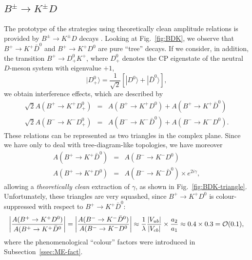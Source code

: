 \documentclass[12pt]{article}
\begin{document}
\subsection{$B^\pm\to K^\pm D$}
\unboldmath
%
%
%
The prototype of the strategies using theoretically clean amplitude 
relations is provided by $B^\pm \to K^\pm D$ decays \cite{gw}. Looking at 
Fig.~\ref{fig:BDK}, we observe that $B^+\to K^+\bar D^0$ and $B^+\to K^+D^0$ 
are pure ``tree'' decays. If we consider, in addition, the transition 
$B^+\to D^0_+K^+$, where $D^0_+$ denotes the CP 
eigenstate of the neutral $D$-meson system with eigenvalue $+1$,
\begin{equation}\label{ED85}
|D^0_+\rangle=\frac{1}{\sqrt{2}}\left[|D^0\rangle+
|\bar D^0\rangle\right],
\end{equation}
we obtain interference effects, which are described by
\begin{eqnarray}
\sqrt{2}A(B^+\to K^+D^0_+)&=&A(B^+\to K^+D^0)+
A(B^+\to K^+\bar D^0)\\
\sqrt{2}A(B^-\to K^-D^0_+)&=&A(B^-\to K^-\bar D^0)+
A(B^-\to K^-D^0).
\end{eqnarray}
These relations can be represented as two triangles in 
the complex plane. Since we have only to deal with tree-diagram-like 
topologies, we have moreover
\begin{eqnarray}
A(B^+\to K^+\bar D^0)&=&A(B^-\to K^-D^0)\\
A(B^+\to K^+D^0)&=&A(B^-\to K^-\bar D^0)\times e^{2i\gamma},
\end{eqnarray}
allowing a {\it theoretically clean} extraction of $\gamma$, as shown 
in Fig.~\ref{fig:BDK-triangle}. Unfortunately, these triangles are 
very squashed, since $B^+\to K^+D^0$ is colour-suppressed 
with respect to $B^+\to K^+\bar D^0$:
\begin{equation}\label{BDK-suppr}
\left|\frac{A(B^+\to K^+D^0)}{A(B^+\to K^+\bar D^0}\right|=
\left|\frac{A(B^-\to K^-\bar D^0)}{A(B^-\to K^-D^0}\right|\approx
\frac{1}{\lambda}\frac{|V_{ub}|}{|V_{cb}|}\times\frac{a_2}{a_1}
\approx 0.4\times0.3={\cal O}(0.1),
\end{equation}
where the phenomenological ``colour'' factors were introduced in
Subsection~\ref{ssec:ME-fact}. 
\end{document}
